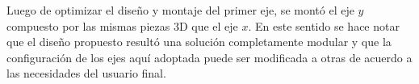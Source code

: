 Luego de optimizar el diseño y montaje del primer eje, se montó el eje $\textit{y}$ compuesto por las mismas piezas 3D que el eje $\textit{x}$. En este sentido se hace notar que el diseño propuesto resultó una solución completamente modular y que la configuración de los ejes aquí adoptada puede ser modificada a otras de acuerdo a las necesidades del usuario final.
 
\begin{figure}[H]
	\begin{floatrow}

\end{floatrow}
\end{figure}
